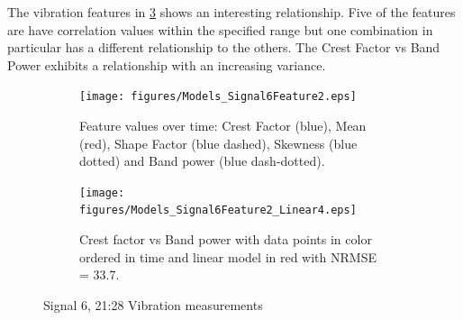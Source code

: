 \documentclass[]{article}
\begin{document}
The vibration features in \cref{fig:Models_Signal6Feature2_Caption} shows an interesting relationship. Five of the features are have correlation values within the specified range but one combination in particular has a different relationship to the others. The Crest Factor vs Band Power exhibits a relationship with an increasing variance. 
\begin{figure}[H]
    \centering
		\begin{subfigure}[t]{.45\textwidth}
		  	\centering
    			\texttt{[image: figures/Models\_Signal6Feature2.eps]}
		  	\caption{Feature values over time: Crest Factor (blue), Mean (red), Shape Factor (blue dashed), Skewness (blue dotted) and Band power (blue dash-dotted).}
		  	\label{fig:Models_Signal6Feature1}
		\end{subfigure}\hspace{\fill}%
		\begin{subfigure}[t]{.45\textwidth}
		  	\centering
 		   	\texttt{[image: figures/Models\_Signal6Feature2\_Linear4.eps]}
		  	\caption{Crest factor vs Band power with data points in color ordered in time and linear model in red with \gls{NRMSE} = 33.7.}
		  	\label{fig:Models_Signal6Feature2_Linear4}
		\end{subfigure}
    \caption{Signal 6, 21:28 Vibration measurements}
    \label{fig:Models_Signal6Feature2_Caption}
\end{figure}
\end{document}
